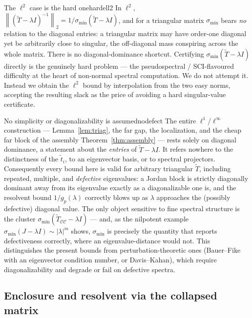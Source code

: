 \documentclass[11pt, a4paper]{article}
\numberwithin{equation}{section}
\newcommand{\norm}[1]{\left\|#1\right\|}
\newcommand{\abs}[1]{\left|#1\right|}
\newcommand{\tT}{\widetilde{T}}
\begin{document}
\begin{remark}{The $\ell^2$ case is the hard one}{hardell2}
  In $\ell^2$, $\norm{(\tT - \lambda I)^{-1}}_2 = 1/\sigma_{\min}(\tT - \lambda
  I)$, and for a triangular matrix $\sigma_{\min}$ bears \emph{no} relation to
  the diagonal entries: a triangular matrix may have order-one diagonal yet be
  arbitrarily close to singular, the off-diagonal mass conspiring across the
  whole matrix.  There is no diagonal-dominance shortcut.  Certifying
  $\sigma_{\min}(\tT - \lambda I)$ directly is the genuinely hard problem ---
  the pseudospectral / SCI-flavoured difficulty at the heart of non-normal
  spectral computation.  We do not attempt it.  Instead we obtain the $\ell^2$
  bound by interpolation from the two easy norms, accepting the resulting slack
  as the price of avoiding a hard singular-value certificate.
\end{remark}

\begin{remark}{No simplicity or diagonalizability is assumed}{nodefect}
  The entire $\ell^1$/$\ell^\infty$ construction --- Lemma~\ref{lem:triag}, the
  far gap, the localization, and the cheap far block of the assembly
  Theorem~\ref{thm:assembly} --- rests solely on diagonal dominance, a statement
  about the \emph{entries} of $\tT - \lambda I$.  It refers nowhere to the
  distinctness of the $\tilde t_i$, to an eigenvector basis, or to spectral
  projectors.  Consequently every bound here is valid for arbitrary triangular
  $\tT$, including repeated, multiple, and \emph{defective} eigenvalues: a
  Jordan block is strictly diagonally dominant away from its eigenvalue exactly
  as a diagonalizable one is, and the resolvent bound $1/g_p(\lambda)$ correctly
  blows up as $\lambda$ approaches the (possibly defective) diagonal value.  The
  only object sensitive to fine spectral structure is the cluster
  $\sigma_{\min}(\tT_{\mathcal{C}\mathcal{C}} - \lambda I)$ --- and, as the
  nilpotent example $\sigma_{\min}(J - \lambda I) \sim \abs{\lambda}^{m}$ shows,
  $\sigma_{\min}$ is precisely the quantity that reports defectiveness
  correctly, where an eigenvalue-distance would not.  This distinguishes the
  present bounds from perturbation-theoretic ones (Bauer--Fike with an
  eigenvector condition number, or Davis--Kahan), which require diagonalizability
  and degrade or fail on defective spectra.
\end{remark}

\subsection{Enclosure and resolvent via the collapsed matrix}
\end{document}
